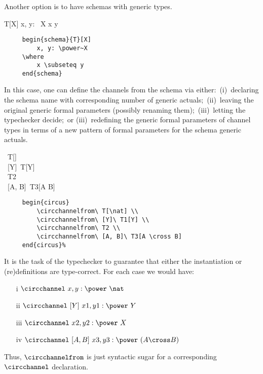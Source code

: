 \documentclass{article}
\begin{document}
%

%
%

Another option is to have schemas with generic types.
%
\begin{schema}{T}[X]
   x, y: \power~X
\where
   x \subseteq y
\end{schema}
%
\begin{verbatim}
     begin{schema}{T}[X]
         x, y: \power~X
     \where
         x \subseteq y
     end{schema}
\end{verbatim}
%
In this case, one can define the channels from the schema via
either:~(i)~declaring the schema name with corresponding number of generic
actuals;~(ii)~leaving the original generic formal parameters (possibly renaming
them);~(iii)~letting the typechecker decide;~or (iii)~redefining the generic
formal parameters of channel types in terms of a new pattern of formal
parameters for the schema generic actuals.
%
\begin{circus}
    \circchannelfrom\ T[\nat] \\
    \circchannelfrom\ [Y]\ T[Y] \\
    \circchannelfrom\ T2 \\  %
    \circchannelfrom\ [A, B]\ T3[A \cross B]
\end{circus}%
%
\begin{verbatim}
     begin{circus}
         \circchannelfrom\ T[\nat] \\
         \circchannelfrom\ [Y]\ T1[Y] \\
         \circchannelfrom\ T2 \\
         \circchannelfrom\ [A, B]\ T3[A \cross B]
     end{circus}%
\end{verbatim}
%
It is the task of the typechecker to guarantee that either the instantiation or
(re)definitions are type-correct. For each case we would have:
%
\begin{itemize}
    \item[i] $\circchannel\ x, y: \power~\nat$
    \item[ii] $\circchannel\ [Y]\ x1, y1: \power~Y$
    \item[iii] $\circchannel\ x2, y2: \power~X$
    \item[iv] $\circchannel\ [A, B]\ x3, y3: \power~(A \cross B)$
\end{itemize}
%
Thus, $\circchannelfrom$ is just syntactic sugar for a corresponding
$\circchannel$ declaration.
\end{document}
